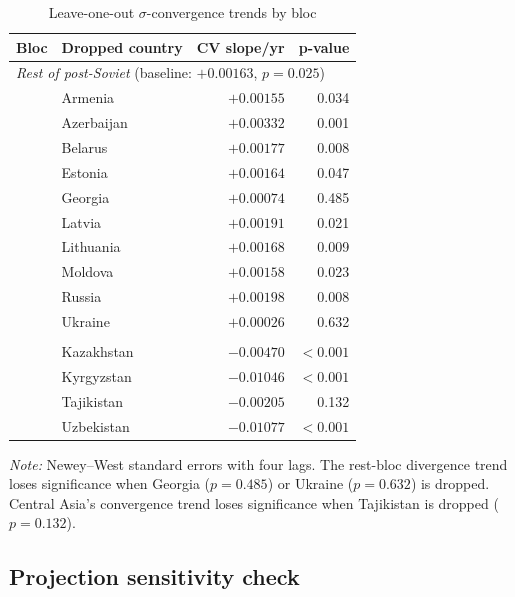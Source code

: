 \begin{table}[htbp]
\centering
\caption{Leave-one-out $\sigma$-convergence trends by bloc}
\label{tab:loo-convergence}
\small
\begin{tabular}{llrr}
\toprule
Bloc & Dropped country & CV slope/yr & p-value \\
\midrule
\multicolumn{4}{l}{\textit{Rest of post-Soviet} (baseline: $+0.00163$, $p = 0.025$)} \\
 & Armenia    & $+0.00155$ & 0.034 \\
 & Azerbaijan & $+0.00332$ & 0.001 \\
 & Belarus    & $+0.00177$ & 0.008 \\
 & Estonia    & $+0.00164$ & 0.047 \\
 & Georgia    & $+0.00074$ & 0.485 \\
 & Latvia     & $+0.00191$ & 0.021 \\
 & Lithuania  & $+0.00168$ & 0.009 \\
 & Moldova    & $+0.00158$ & 0.023 \\
 & Russia     & $+0.00198$ & 0.008 \\
 & Ukraine    & $+0.00026$ & 0.632 \\
\addlinespace
\multicolumn{4}{l}{\textit{Central Asia} (baseline: $-0.00751$, $p < 0.001$)} \\
 & Kazakhstan & $-0.00470$ & $<0.001$ \\
 & Kyrgyzstan & $-0.01046$ & $<0.001$ \\
 & Tajikistan & $-0.00205$ & 0.132 \\
 & Uzbekistan & $-0.01077$ & $<0.001$ \\
\bottomrule
\end{tabular}

\begin{minipage}{\textwidth}\footnotesize
\vspace{4pt}
\emph{Note:} Newey--West standard errors with four lags. The rest-bloc divergence trend loses significance when Georgia ($p = 0.485$) or Ukraine ($p = 0.632$) is dropped. Central Asia's convergence trend loses significance when Tajikistan is dropped ($p = 0.132$).
\end{minipage}
\end{table}

\subsection{Projection sensitivity check}
\label{app:projection-check}

